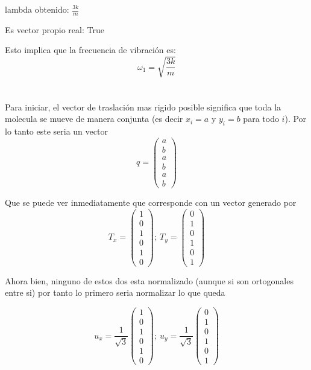\documentclass[12pt]{amsart}
\begin{document}
lambda obtenido: $\frac{3 k}{m}$

Es vector propio real: True

Esto implica que la frecuencia de vibración es:
$$\omega_1 = \sqrt{\frac{3 k}{m}}$$


\section{}

Para iniciar, el vector de traslación mas rigido posible significa que toda la molecula se mueve de manera conjunta (es decir $x_i = a$ y $y_i = b$ para todo $i$). Por lo tanto este seria un vector
$$
q = \begin{pmatrix} a \\ b\\ a\\ b\\ a\\ b\end{pmatrix}
$$

  Que se puede ver inmediatamente que corresponde con un vector generado por
$$T_x = \begin{pmatrix} 1 \\ 0\\ 1\\ 0\\ 1\\ 0\end{pmatrix};\ T_y = \begin{pmatrix} 0 \\ 1\\ 0\\ 1\\ 0\\ 1\end{pmatrix}$$

Ahora bien, ninguno de estos dos esta normalizado (aunque si son ortogonales entre si) por tanto lo primero seria normalizar lo que queda

$$u_x = \frac{1}{\sqrt{3}}\begin{pmatrix} 1 \\ 0\\ 1\\ 0\\ 1\\ 0\end{pmatrix};\ u_y = \frac{1}{\sqrt{3}}\begin{pmatrix} 0 \\ 1\\ 0\\ 1\\ 0\\ 1\end{pmatrix}$$
\end{document}
